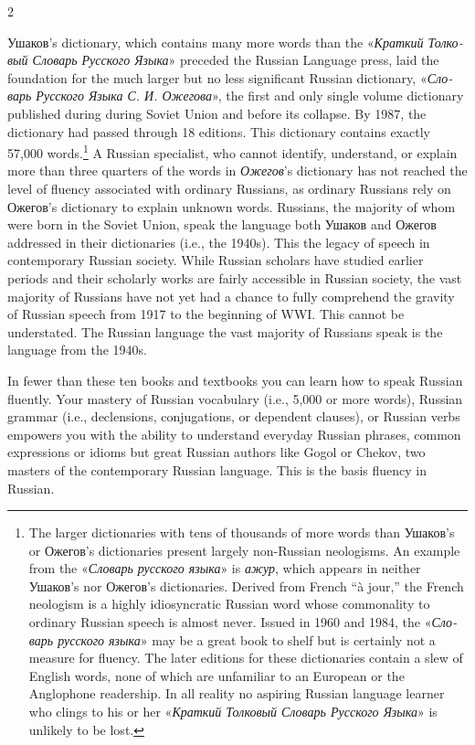 \documentclass[10pt,a4paper,twoside]{article} %
\begin{document}
\begin{multicols}{2}
{\newline \indent \textrussian{Ушаков}’s dictionary, which contains many more words than the \textrussian{«\emph{Краткий Толковый Словарь Русского Языка}»} preceded the Russian Language press, laid the foundation for the much larger but no less significant Russian dictionary, \textrussian{«\emph{Словарь Русского Языка С. И. Ожегова}}», the first and only single volume dictionary published during during Soviet Union and before its collapse. By 1987, the dictionary had passed through 18 editions. This dictionary contains exactly 57,000 words.\footnote{ The larger dictionaries with tens of thousands of more words than \textrussian{Ушаков}’s or \textrussian{Ожегов}’s dictionaries present largely non-Russian neologisms. An example from the \textrussian{«\emph{Словарь русского языка}»} is \textrussian{\emph{ажур}}, which appears in neither \textrussian{Ушаков}’s nor \textrussian{Ожегов}’s dictionaries. Derived from French “\textfrench{à jour},” the French neologism is a highly idiosyncratic Russian word whose commonality to ordinary Russian speech is almost never. Issued in 1960 and 1984, the \textrussian{«\emph{Словарь русского языка}»} may be a great book to shelf but is certainly not a measure for fluency. The later editions for these dictionaries contain a slew of English words, none of which are unfamiliar to an European or the Anglophone readership. In all reality no aspiring Russian language learner who clings to his or her \textrussian{«\emph{Краткий Толковый Словарь Русского Языка}»}  is unlikely to be lost.} A Russian specialist, who cannot identify, understand, or explain more than three quarters of the words in \textrussian{\emph{Ожегов}}’s dictionary has not reached the level of fluency associated with ordinary Russians, as ordinary Russians rely on \textrussian{Ожегов}’s dictionary to explain unknown words. Russians, the majority of whom were born in the Soviet Union, speak the language both \textrussian{Ушаков} and \textrussian{Ожегов} addressed in their dictionaries (i.e., the 1940s). This the legacy of speech in contemporary Russian society. While Russian scholars have studied earlier periods and their scholarly works are fairly accessible in Russian society, the vast majority of Russians have not yet had a chance to fully comprehend the gravity of Russian speech from 1917 to the beginning of WWI. This cannot be understated. The Russian language the vast majority of Russians speak is the language from the 1940s. 

\newline \indent In fewer than these ten books and textbooks you can learn how to speak Russian fluently. Your mastery of Russian vocabulary (i.e., 5,000 or more words), Russian grammar (i.e., declensions, conjugations, or dependent clauses), or Russian verbs empowers you with the ability to understand everyday Russian phrases, common expressions or idioms but great Russian authors like Gogol or Chekov, two masters of the contemporary Russian language. This is the basis fluency in Russian. 

}
\end{multicols}
\end{document}
